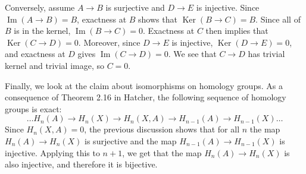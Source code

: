 \documentclass[12 pt]{article}
\DeclareMathOperator{\Ker}{Ker}
\DeclareMathOperator{\imag}{Im}
\begin{document}
Conversely, assume $A \to B$ is surjective and $D \to E$ is injective. Since $\imag(A \to B) = B$, exactness
at $B$ shows that $\Ker(B \to C) = B$. Since all of $B$ is in the kernel, $\imag (B \to C) = 0$. Exactness at
$C$ then implies that $\Ker(C \to D) = 0$. Moreover, since $D \to E$ is injective, $\Ker (D \to E) = 0$, and
exactness at $D$ gives $\imag (C \to D) = 0$. We see that $C \to D$ has trivial kernel and trivial image,
so $C = 0$.

Finally, we look at the claim about isomorphisms on homology groups. As a consequence of Theorem 2.16
in Hatcher, the following sequence of homology groups is exact:
\[	\dots H_n(A) \to H_n(X) \to H_n(X,A) \to H_{n-1}(A) \to H_{n-1}(X) \dots	\]
Since $H_n(X,A) = 0$, the previous discussion shows that for all $n$ the map $H_n(A) \to H_n(X)$ is
surjective and the map $H_{n-1}(A) \to H_{n-1}(X)$ is injective. Applying this to $n+1$, we get that
the map $H_n(A) \to H_n(X)$ is also injective, and therefore it is bijective.
\end{document}
